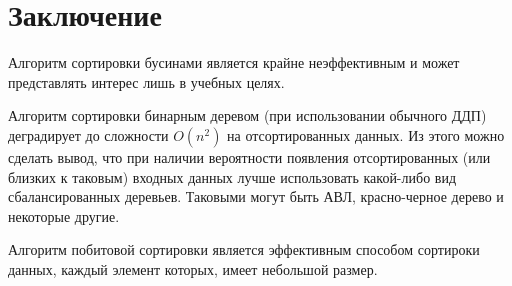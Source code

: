 \chapter*{Заключение}

Алгоритм сортировки бусинами является крайне неэффективным и может представлять интерес лишь в учебных целях.

Алгоритм сортировки бинарным деревом (при использовании обычного ДДП) деградирует до сложности $O(n^2)$ на отсортированных данных. Из этого можно сделать вывод, что при наличии  вероятности появления отсортированных (или близких к таковым) входных данных лучше использовать какой-либо вид сбалансированных деревьев. Таковыми могут быть АВЛ, красно-черное дерево и некоторые другие.

Алгоритм побитовой сортировки является  эффективным способом сортироки данных, каждый элемент которых, имеет небольшой размер.